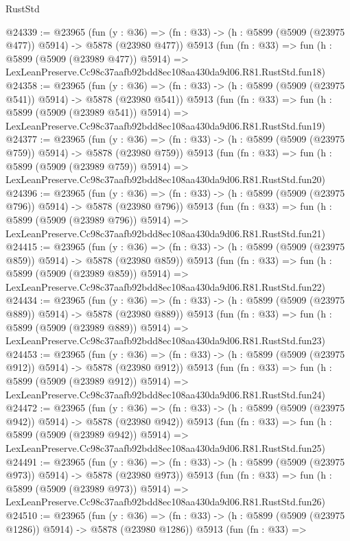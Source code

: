 \begin{lexlean}{RustStd}
\begin{coremodule}
{{@24339 := @23965
    (fun (y : @36) => (fn : @33) -> (h : @5899 (@5909 (@23975 @477)) @5914) -> @5878 (@23980 @477))
    @5913
    (fun (fn : @33) =>
    fun (h : @5899 (@5909 (@23989 @477)) @5914) =>
    LexLeanPreserve.Cc98c37aafb92bdd8ec108aa430da9d06.R81.RustStd.fun18)
@24358 := @23965
    (fun (y : @36) => (fn : @33) -> (h : @5899 (@5909 (@23975 @541)) @5914) -> @5878 (@23980 @541))
    @5913
    (fun (fn : @33) =>
    fun (h : @5899 (@5909 (@23989 @541)) @5914) =>
    LexLeanPreserve.Cc98c37aafb92bdd8ec108aa430da9d06.R81.RustStd.fun19)
@24377 := @23965
    (fun (y : @36) => (fn : @33) -> (h : @5899 (@5909 (@23975 @759)) @5914) -> @5878 (@23980 @759))
    @5913
    (fun (fn : @33) =>
    fun (h : @5899 (@5909 (@23989 @759)) @5914) =>
    LexLeanPreserve.Cc98c37aafb92bdd8ec108aa430da9d06.R81.RustStd.fun20)
@24396 := @23965
    (fun (y : @36) => (fn : @33) -> (h : @5899 (@5909 (@23975 @796)) @5914) -> @5878 (@23980 @796))
    @5913
    (fun (fn : @33) =>
    fun (h : @5899 (@5909 (@23989 @796)) @5914) =>
    LexLeanPreserve.Cc98c37aafb92bdd8ec108aa430da9d06.R81.RustStd.fun21)
@24415 := @23965
    (fun (y : @36) => (fn : @33) -> (h : @5899 (@5909 (@23975 @859)) @5914) -> @5878 (@23980 @859))
    @5913
    (fun (fn : @33) =>
    fun (h : @5899 (@5909 (@23989 @859)) @5914) =>
    LexLeanPreserve.Cc98c37aafb92bdd8ec108aa430da9d06.R81.RustStd.fun22)
@24434 := @23965
    (fun (y : @36) => (fn : @33) -> (h : @5899 (@5909 (@23975 @889)) @5914) -> @5878 (@23980 @889))
    @5913
    (fun (fn : @33) =>
    fun (h : @5899 (@5909 (@23989 @889)) @5914) =>
    LexLeanPreserve.Cc98c37aafb92bdd8ec108aa430da9d06.R81.RustStd.fun23)
@24453 := @23965
    (fun (y : @36) => (fn : @33) -> (h : @5899 (@5909 (@23975 @912)) @5914) -> @5878 (@23980 @912))
    @5913
    (fun (fn : @33) =>
    fun (h : @5899 (@5909 (@23989 @912)) @5914) =>
    LexLeanPreserve.Cc98c37aafb92bdd8ec108aa430da9d06.R81.RustStd.fun24)
@24472 := @23965
    (fun (y : @36) => (fn : @33) -> (h : @5899 (@5909 (@23975 @942)) @5914) -> @5878 (@23980 @942))
    @5913
    (fun (fn : @33) =>
    fun (h : @5899 (@5909 (@23989 @942)) @5914) =>
    LexLeanPreserve.Cc98c37aafb92bdd8ec108aa430da9d06.R81.RustStd.fun25)
@24491 := @23965
    (fun (y : @36) => (fn : @33) -> (h : @5899 (@5909 (@23975 @973)) @5914) -> @5878 (@23980 @973))
    @5913
    (fun (fn : @33) =>
    fun (h : @5899 (@5909 (@23989 @973)) @5914) =>
    LexLeanPreserve.Cc98c37aafb92bdd8ec108aa430da9d06.R81.RustStd.fun26)
@24510 := @23965
    (fun (y : @36) =>
    (fn : @33) -> (h : @5899 (@5909 (@23975 @1286)) @5914) -> @5878 (@23980 @1286))
    @5913
    (fun (fn : @33) =>
}}
\end{coremodule}
\end{lexlean}

